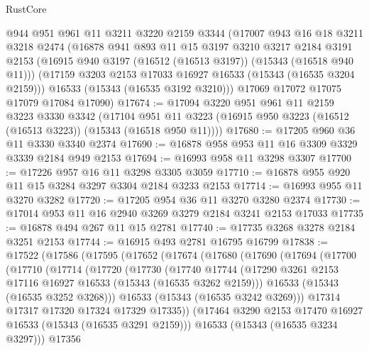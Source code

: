 \begin{lexlean}{RustCore}
\begin{coremodule}
    @944
    @951
    @961
    @11
    @3211
    @3220
    @2159
    @3344
    (@17007
      @943
      @16
      @18
      @3211
      @3218
      @2474
      (@16878
        @941
        @893
        @11
        @15
        @3197
        @3210
        @3217
        @2184
        @3191
        @2153
        (@16915 @940 @3197 (@16512 (@16513 @3197)) (@15343 (@16518 @940 @11)))
        (@17159 @3203 @2153 @17033 @16927 @16533 (@15343 (@16535 @3204 @2159)))
        @16533
        (@15343 (@16535 @3192 @3210)))
      @17069
      @17072
      @17075
      @17079
      @17084
      @17090)
@17674 := @17094
    @3220
    @951
    @961
    @11
    @2159
    @3223
    @3330
    @3342
    (@17104 @951 @11 @3223 (@16915 @950 @3223 (@16512 (@16513 @3223)) (@15343 (@16518 @950 @11))))
@17680 := @17205 @960 @36 @11 @3330 @3340 @2374
@17690 := @16878 @958 @953 @11 @16 @3309 @3329 @3339 @2184 @949 @2153
@17694 := @16993 @958 @11 @3298 @3307
@17700 := @17226 @957 @16 @11 @3298 @3305 @3059
@17710 := @16878 @955 @920 @11 @15 @3284 @3297 @3304 @2184 @3233 @2153
@17714 := @16993 @955 @11 @3270 @3282
@17720 := @17205 @954 @36 @11 @3270 @3280 @2374
@17730 := @17014 @953 @11 @16 @2940 @3269 @3279 @2184 @3241 @2153 @17033
@17735 := @16878 @494 @267 @11 @15 @2781
@17740 := @17735 @3268 @3278 @2184 @3251 @2153
@17744 := @16915 @493 @2781 @16795 @16799
@17838 := @17522
    (@17586
      (@17595
        (@17652
          (@17674
            (@17680
              (@17690
                (@17694
                  (@17700
                    (@17710
                      (@17714
                        (@17720
                          (@17730
                            (@17740
                              @17744
                              (@17290
                                @3261
                                @2153
                                @17116
                                @16927
                                @16533
                                (@15343 (@16535 @3262 @2159)))
                              @16533
                              (@15343 (@16535 @3252 @3268)))
                            @16533
                            (@15343 (@16535 @3242 @3269)))
                          @17314
                          @17317
                          @17320
                          @17324
                          @17329
                          @17335))
                      (@17464 @3290 @2153 @17470 @16927 @16533 (@15343 (@16535 @3291 @2159)))
                      @16533
                      (@15343 (@16535 @3234 @3297)))
                    @17356

\end{coremodule}
\end{lexlean}
